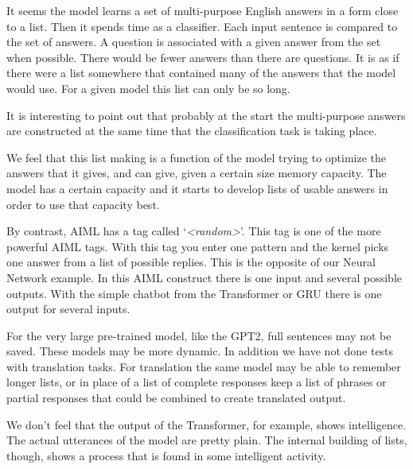 It seems the model learns a set of multi-purpose English answers in a form close to a list. Then it spends time as a classifier. Each input sentence is compared to the set of answers. A question is associated with a given answer from the set when possible. There would be fewer answers than there are questions. It is as if there were a list somewhere that contained many of the answers that the model would use. For a given model this list can only be so long.

It is interesting to point out that probably at the start the multi-purpose answers are constructed at the same time that the classification task is taking place. 

We feel that this list making is a function of the model trying to optimize the answers that it gives, and can give, given a certain size memory capacity. The model has a certain capacity and it starts to develop lists of usable answers in order to use that capacity best.

By contrast, AIML has a tag called `\textit{<random>}'. This tag is one of the more powerful AIML tags. With this tag you enter one pattern and the kernel picks one answer from a list of possible replies. This is the opposite of our Neural Network example. In this AIML construct there is one input and several possible outputs. With the simple chatbot from the Transformer or GRU there is one output for several inputs.

For the very large pre-trained model, like the GPT2, full sentences may not be saved. These models may be more dynamic. In addition we have not done tests with translation tasks. For translation the same model may be able to remember longer lists, or in place of a list of complete responses keep a list of phrases or partial responses that could be combined to create translated output.

We don't feel that the output of the Transformer, for example, shows intelligence. The actual utterances of the model are pretty plain. The internal building of lists, though, shows a process that is found in some intelligent activity.